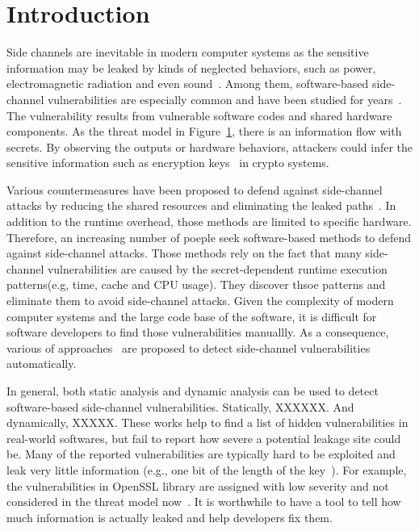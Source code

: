 \section{Introduction}
Side channels are inevitable in modern computer systems as the sensitive information 
may be leaked by kinds of neglected behaviors, 
such as power, electromagnetic radiation and even sound~\cite{}. 
Among them, software-based side-channel vulnerabilities are especially common and have been studied for years~\cite{}. 
The vulnerability results from vulnerable software codes and shared hardware components.
As the threat model in Figure~\ref{}, there is an information flow with secrets.  
By observing the outputs or hardware behaviors, attackers could 
infer the sensitive information such as encryption keys~\cite{} in crypto 
systems.

Various countermeasures have been proposed to defend against 
side-channel attacks by reducing the shared resources
and eliminating the leaked paths~\cite{182946,203878,217537}. 
In addition to the runtime overhead, those methods are limited to specific hardware.
Therefore, an increasing number of poeple seek software-based methods to 
defend against side-channel attacks. Those methods rely on the 
fact that many side-channel vulnerabilities are caused by the 
secret-dependent runtime execution patterns(e.g, time, cache and CPU usage). 
They discover thsoe patterns and eliminate them to avoid side-channel attacks. 
Given the complexity of modern computer systems and the large code base of the
software, it is difficult for software developers to find those vulnerabilities
manuallly. As a consequence, various of approaches~\cite{182946,203878,Osvik:2006:CAC:2117739.2117741} 
are proposed to detect side-channel vulnerabilities automatically.


In general, both static analysis and dynamic analysis
can be used to detect software-based side-channel vulnerabilities.
Statically, XXXXXX. And dynamically, XXXXX.
These works help to find a list of hidden vulnerabilities in real-world softwares, 
but fail to report how severe a potential leakage site could be. 
Many of the reported vulnerabilities are typically hard to be exploited 
and leak very little information (e.g., one bit of the length of the key~\cite{203878}).  
For example, the vulnerabilities in OpenSSL library are assigned with low severity and not considered 
in the threat model now~\cite{OpenSSL:Security:Policy}. 
It is worthwhile to have a tool to tell how much information is actually leaked and help 
developers fix them.


